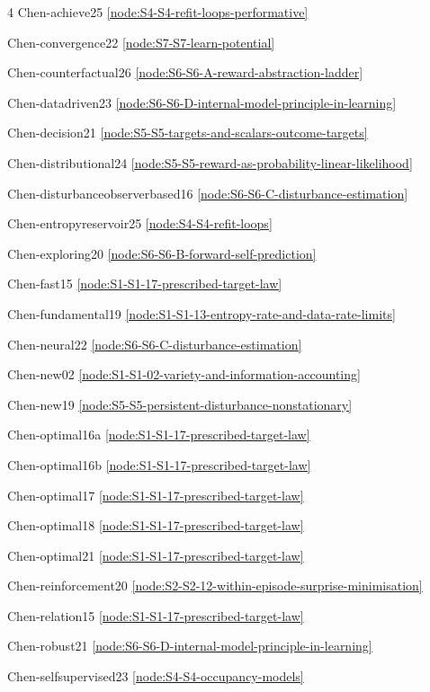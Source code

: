 \documentclass[10pt]{article}
\begin{document}
{\begin{multicols}{4}
Chen-achieve25 \hfill \ref{node:S4-S4-refit-loops-performative}\par
Chen-convergence22 \hfill \ref{node:S7-S7-learn-potential}\par
Chen-counterfactual26 \hfill \ref{node:S6-S6-A-reward-abstraction-ladder}\par
Chen-datadriven23 \hfill \ref{node:S6-S6-D-internal-model-principle-in-learning}\par
Chen-decision21 \hfill \ref{node:S5-S5-targets-and-scalars-outcome-targets}\par
Chen-distributional24 \hfill \ref{node:S5-S5-reward-as-probability-linear-likelihood}\par
Chen-disturbanceobserverbased16 \hfill \ref{node:S6-S6-C-disturbance-estimation}\par
Chen-entropyreservoir25 \hfill \ref{node:S4-S4-refit-loops}\par
Chen-exploring20 \hfill \ref{node:S6-S6-B-forward-self-prediction}\par
Chen-fast15 \hfill \ref{node:S1-S1-17-prescribed-target-law}\par
Chen-fundamental19 \hfill \ref{node:S1-S1-13-entropy-rate-and-data-rate-limits}\par
Chen-neural22 \hfill \ref{node:S6-S6-C-disturbance-estimation}\par
Chen-new02 \hfill \ref{node:S1-S1-02-variety-and-information-accounting}\par
Chen-new19 \hfill \ref{node:S5-S5-persistent-disturbance-nonstationary}\par
Chen-optimal16a \hfill \ref{node:S1-S1-17-prescribed-target-law}\par
Chen-optimal16b \hfill \ref{node:S1-S1-17-prescribed-target-law}\par
Chen-optimal17 \hfill \ref{node:S1-S1-17-prescribed-target-law}\par
Chen-optimal18 \hfill \ref{node:S1-S1-17-prescribed-target-law}\par
Chen-optimal21 \hfill \ref{node:S1-S1-17-prescribed-target-law}\par
Chen-reinforcement20 \hfill \ref{node:S2-S2-12-within-episode-surprise-minimisation}\par
Chen-relation15 \hfill \ref{node:S1-S1-17-prescribed-target-law}\par
Chen-robust21 \hfill \ref{node:S6-S6-D-internal-model-principle-in-learning}\par
Chen-selfsupervised23 \hfill \ref{node:S4-S4-occupancy-models}\par

\end{multicols}}
\end{document}
